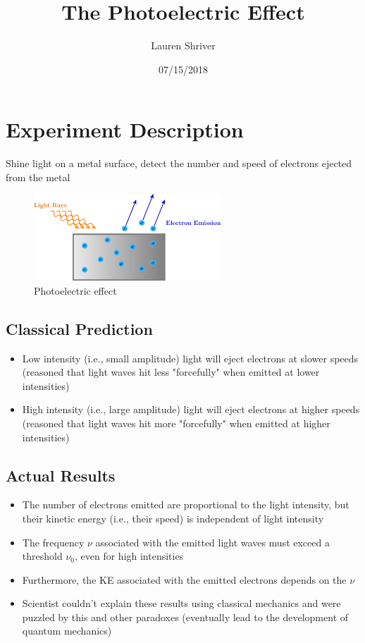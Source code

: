 \documentclass[a4paper]{article}
\title{The Photoelectric Effect}
\author{Lauren Shriver}
\date{07/15/2018}
\begin{document}
	\maketitle
	\section*{Experiment Description}
		Shine light on a metal surface, detect the number and speed of electrons ejected from the metal
	
    \begin{figure}[htp!]
        \centering
        \includegraphics[width=7cm]{photoelectric_effect.png}
        \caption{Photoelectric effect}
        \label{fig:my_label}
    \end{figure}
	
	\subsection*{Classical Prediction}	
		\begin{itemize}
			\item Low intensity (i.e., small amplitude) light will eject electrons at slower speeds (reasoned that light waves hit less "forcefully" when emitted at lower intensities)
			\item High intensity (i.e., large amplitude) light will eject electrons at higher speeds (reasoned that light waves hit more "forcefully" when emitted at higher intensities)
		\end{itemize}
	\subsection*{Actual Results}		
		\begin{itemize}
			\item The number of electrons emitted are proportional to the light intensity, but their kinetic energy (i.e., their speed) is independent of light intensity 
			\item The frequency $\nu$ associated with the emitted light waves must exceed a threshold $\nu_0$, even for high intensities 
			\item Furthermore, the KE associated with the emitted electrons depends on the $\nu$ 
			\item Scientist couldn't explain these results using classical mechanics and were puzzled by this and other paradoxes (eventually lead to the development of quantum mechanics)
		\end{itemize}
\end{document}
